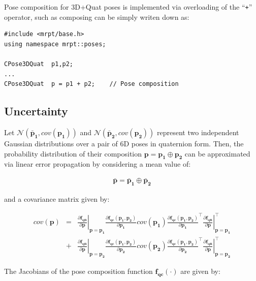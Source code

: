 \documentclass[a4paper,11pt]{report}
\begin{document}
Pose composition for 3D+Quat poses is implemented via overloading 
of the ``\texttt{+}'' operator, such as composing can be simply 
writen down as:

\begin{lstlisting}
#include <mrpt/base.h> 
using namespace mrpt::poses; 

CPose3DQuat  p1,p2; 
...
CPose3DQuat  p = p1 + p2;    // Pose composition
\end{lstlisting}


\subsection{Uncertainty}

Let $\mathcal{N}(\mathbf{\bar{p}_1}, cov(\mathbf{p_1}))$ and 
$\mathcal{N}(\mathbf{\bar{p}_2}, cov(\mathbf{p_2}))$ represent
two independent Gaussian distributions over a pair of 6D 
poses in quaternion form.
Then, the probability distribution of their composition 
$\mathbf{p} = \mathbf{p_1} \oplus \mathbf{p_2}$
can be approximated via linear error propagation by considering 
a mean value of:

\begin{eqnarray}
\mathbf{\bar{p}} = \mathbf{\bar{p}_1} \oplus \mathbf{\bar{p}_2}
\end{eqnarray}

\noindent and a covariance matrix given by:

\begin{eqnarray}
cov(\mathbf{p}) &=& 
\left. \frac{\partial \mathbf{f_{qn}} }{\partial \mathbf{p}} \right|_{\mathbf{p}=\mathbf{p_1}}
\frac{\partial \mathbf{f_{qc}}(\mathbf{p_1},\mathbf{p_2}) }{\partial \mathbf{p_1}}
cov(\mathbf{p_1})
\frac{\partial \mathbf{f_{qc}}(\mathbf{p_1},\mathbf{p_2}) }{\partial \mathbf{p_1}}^\top
\left. \frac{\partial \mathbf{f_{qn}} }{\partial \mathbf{p}} \right|_{\mathbf{p}=\mathbf{p_1}} ^\top
\nonumber \\ &+&
\left. \frac{\partial \mathbf{f_{qn}} }{\partial \mathbf{p}} \right|_{\mathbf{p}=\mathbf{p_2}}
\frac{\partial \mathbf{f_{qc}}(\mathbf{p_1},\mathbf{p_2}) }{\partial \mathbf{p_2}}
cov(\mathbf{p_2})
\frac{\partial \mathbf{f_{qc}}(\mathbf{p_1},\mathbf{p_2}) }{\partial \mathbf{p_2}}^\top
\left. \frac{\partial \mathbf{f_{qn}} }{\partial \mathbf{p}} \right|_{\mathbf{p}=\mathbf{p_2}}^\top
\end{eqnarray}

The Jacobians of the pose composition function $\mathbf{f_{qc}}(\cdot)$ are given by:
\end{document}
